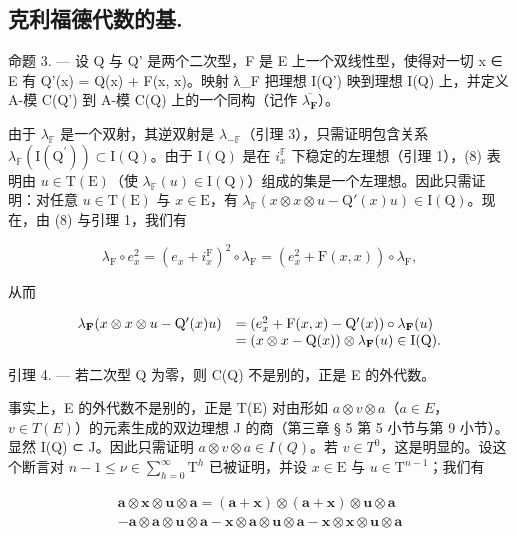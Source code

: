 \subsection{克利福德代数的基.}

命题 3. --- 设 Q 与 Q' 是两个二次型，F 是 E 上一个双线性型，使得对一切 x ∈ E 有 Q'(x) = Q(x) + F(x, x)。映射 λ\_F 把理想 I(Q') 映到理想 I(Q) 上，并定义 A-模 C(Q') 到 A-模 C(Q) 上的一个同构（记作 \(\overline{\lambda_{\mathbf{F}}}\)）。

  由于 \(\lambda_{\mathbb{F}}\) 是一个双射，其逆双射是 \(\lambda_{-\mathbb{F}}\)（引理 3），只需证明包含关系 \(\lambda_{\mathbb{F}}(\mathrm{I}(\mathrm{Q}^{\prime})) \subset \mathrm{I}(\mathrm{Q})\)。由于 \(\mathrm{I}(\mathrm{Q})\) 是在 \(i_x^{\mathbb{F}}\) 下稳定的左理想（引理 1），(8) 表明由 \(u \in \mathrm{T}(\mathrm{E})\)（使 \(\lambda_{\mathbb{F}}(u) \in \mathrm{I}(\mathrm{Q})\)）组成的集是一个左理想。因此只需证明：对任意 \(u \in \mathrm{T}(\mathrm{E})\) 与 \(x \in \mathrm{E}\)，有 \(\lambda_{\mathbb{F}}(x \otimes x \otimes u - \mathrm{Q}'(x)u) \in \mathrm{I}(\mathrm{Q})\)。现在，由 (8) 与引理 1，我们有

\[
\lambda_ {\mathrm{F}} \circ e _ {x} ^ {2} = (e _ {x} + i _ {x} ^ {\mathrm{F}}) ^ {2} \circ \lambda_ {\mathrm{F}} = (e _ {x} ^ {2} + \mathrm{F} (x, x)) \circ \lambda_ {\mathrm{F}},
\]

从而

\[
\begin{array}{r l} \lambda_ {\mathbf {F}} (x \otimes x \otimes u - \mathrm{Q} ^ {\prime} (x) u) & = (e _ {x} ^ {2} + \mathrm{F} (x, x) - \mathrm{Q} ^ {\prime} (x)) \circ \lambda_ {\mathbf {F}} (u) \\ & = (x \otimes x - \mathrm{Q} (x)) \otimes \lambda_ {\mathbf {F}} (u) \in \mathrm{I} (\mathrm{Q}). \end{array}
\]

引理 4. — 若二次型 Q 为零，则 C(Q) 不是别的，正是 E 的外代数。

  事实上，E 的外代数不是别的，正是 T(E) 对由形如 \(a \otimes v \otimes a\)（\(a \in E\)，\(v \in T(E)\)）的元素生成的双边理想 J 的商（第三章 § 5 第 5 小节与第 9 小节）。显然 I(Q) ⊂ J。因此只需证明 \(a \otimes v \otimes a \in I(Q)\)。若 \(v \in T^0\)，这是明显的。设这个断言对 \(n-1 \leqslant \nu \in \sum_{h=0}^{\infty} \mathrm{T}^{h}\) 已被证明，并设 \(x \in \mathrm{E}\) 与 \(u \in \mathrm{T}^{n-1}\)；我们有

\[
\begin{array}{c} \boldsymbol {a} \otimes \boldsymbol {x} \otimes \boldsymbol {u} \otimes \boldsymbol {a} = (\boldsymbol {a} + \boldsymbol {x}) \otimes (\boldsymbol {a} + \boldsymbol {x}) \otimes \boldsymbol {u} \otimes \boldsymbol {a} \\ - \boldsymbol {a} \otimes \boldsymbol {a} \otimes \boldsymbol {u} \otimes \boldsymbol {a} - \boldsymbol {x} \otimes \boldsymbol {a} \otimes \boldsymbol {u} \otimes \boldsymbol {a} - \boldsymbol {x} \otimes \boldsymbol {x} \otimes \boldsymbol {u} \otimes \boldsymbol {a} \end{array}
\]

